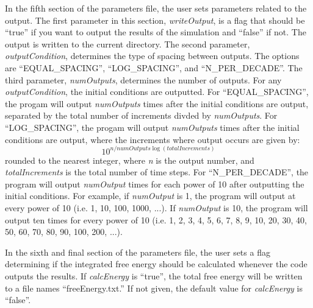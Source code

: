 \documentclass[10pt]{article} %
\begin{document}
In the fifth section of the parameters file, the user sets parameters related to the output. The first parameter in this section, \emph{writeOutput}, is a flag that should be ``true'' if you want to output the results of the simulation and ``false'' if not. The output is written to the current directory. The second parameter, \emph{outputCondition}, determines the type of spacing between outputs. The options are ``EQUAL\_SPACING'', ``LOG\_SPACING'', and ``N\_PER\_DECADE''. The third parameter, \emph{numOutputs}, determines the number of outputs. For any \emph{outputCondition}, the initial conditions are outputted. For ``EQUAL\_SPACING'', the progam will output \emph{numOutputs} times after the initial conditions are output, separated by the total number of increments divded by \emph{numOutputs}. For ``LOG\_SPACING'', the progam will output \emph{numOutputs} times after the initial conditions are output, where the increments where output occurs are given by:
\begin{equation}
10^{n/numOutputs \log(totalIncrements)}
\end{equation}
rounded to the nearest integer, where \emph{n} is the output number, and \emph{totalIncrements} is the total number of time steps. For ``N\_PER\_DECADE'', the program will output \emph{numOutput} times for each power of 10 after outputting the initial conditions. For example, if \emph{numOutput} is 1, the program will output at every power of 10 (i.e. 1, 10, 100, 1000, ...). If \emph{numOutput} is 10, the program will output ten times for every power of 10 (i.e. 1, 2, 3, 4, 5, 6, 7, 8, 9, 10, 20, 30, 40, 50, 60, 70, 80, 90, 100, 200, ...). 

In the sixth and final section of the parameters file, the user sets a flag determining if the integrated free energy should be calculated whenever the code outputs the results. If \emph{calcEnergy} is ``true'', the total free energy will be written to a file names ``freeEnergy.txt.'' If not given, the default value for \emph{calcEnergy} is ``false''.
\end{document}
